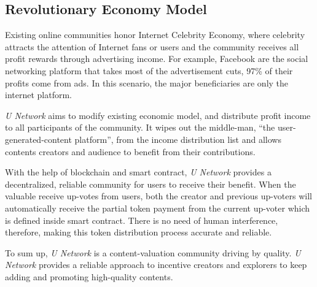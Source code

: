 \subsection{Revolutionary Economy Model}	
Existing online communities honor Internet Celebrity Economy, where celebrity attracts the attention of Internet fans or users and the community receives all profit rewards through advertising income. For example, Facebook are the social networking platform that takes most of the advertisement cuts, 97\% of their profits come from ads. In this scenario, the major beneficiaries are only the internet platform.

\emph{U Network} aims to modify existing economic model, and distribute profit income to all participants of the community. It wipes out the middle-man, ``the user-generated-content platform'',  from the income distribution list and allows contents creators and audience to benefit from their contributions. 

With the help of blockchain and smart contract, \emph{U Network} provides a decentralized, reliable community for users to receive their benefit. When the valuable receive up-votes from users, both the creator and previous up-voters will automatically receive the partial token payment from the current up-voter which is defined inside smart contract. There is no need of human interference, therefore, making this token distribution process accurate and reliable.  

To sum up, \emph{U Network}  is a content-valuation community driving by quality. \emph{U Network} provides a reliable approach to incentive creators and explorers to keep adding and promoting high-quality contents. 